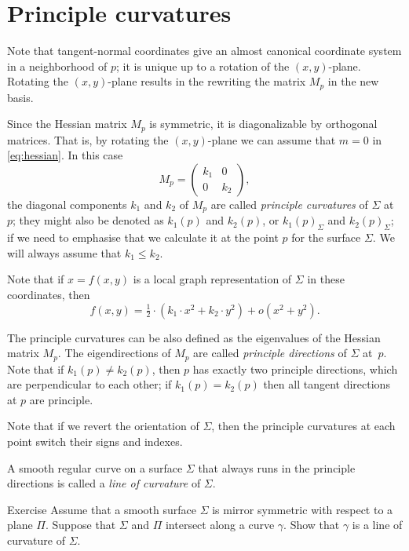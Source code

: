 \section*{Principle curvatures}

Note that tangent-normal coordinates give an almost canonical coordinate system in a neighborhood of $p$;
it is unique up to a rotation of  the $(x,y)$-plane.
Rotating the $(x,y)$-plane results in the rewriting   
the matrix $M_p$ in the new basis.

Since the Hessian matrix $M_p$ is symmetric, it is diagonalizable by orthogonal matrices.
That is, by rotating the $(x,y)$-plane we can assume that $m=0$ in \ref{eq:hessian}. %
In this case
\[M_p=\begin{pmatrix}
   k_1
   &0
   \\
   0
   &k_2
  \end{pmatrix},
\]
the diagonal components $k_1$ and $k_2$ of $M_p$ are called \emph{principle curvatures} of $\Sigma$ at $p$;
they might also be denoted as $k_1(p)$ and $k_2(p)$, or $k_1(p)_\Sigma$ and $k_2(p)_\Sigma$;
if we need to emphasise that we calculate it at the point $p$ for the surface $\Sigma$.
We will always assume that $k_1\le k_2$.


Note that if $x=f(x,y)$ is a local graph representation of $\Sigma$ in these coordinates, then 
\[f(x,y)=\tfrac12\cdot(k_1\cdot x^2+k_2\cdot y^2)+o(x^2+y^2).\]

The principle curvatures can be also defined as the eigenvalues of the Hessian matrix $M_p$.
The eigendirections of $M_p$  are called \emph{principle directions} of $\Sigma$ at~$p$.
Note that if $k_1(p)\ne k_2(p)$, then $p$ has exactly two principle directions, which are perpendicular to each other; if $k_1(p)= k_2(p)$ then all tangent directions at $p$ are principle.

Note that if we revert the orientation of $\Sigma$, then the principle curvatures at each point switch their signs and indexes.

A smooth regular curve on a surface $\Sigma$ that always runs in the principle directions is called a \emph{line of curvature} of $\Sigma$.  

\begin{thm}{Exercise}\label{ex:line-of-curvature}
Assume that a smooth surface $\Sigma$ is mirror symmetric with respect to  a plane $\Pi$.
Suppose that $\Sigma$ and $\Pi$ intersect along a curve $\gamma$.
Show that $\gamma$ is a line of curvature of $\Sigma$.
\end{thm}


